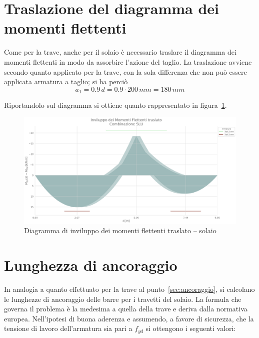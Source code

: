 \section{Traslazione del diagramma dei momenti flettenti }\label{sec:traslazioneSolaio}
Come per la trave, anche per il solaio è necessario traslare il diagramma dei momenti flettenti in modo da assorbire l'azione del taglio. La traslazione avviene secondo quanto applicato per la trave, con la sola differenza che non può essere applicata armatura a taglio; si ha perciò
\[
    a_1 = 0.9\,d = 0.9\cdot 200\,mm = 180\,mm
\]

Riportandolo sul diagramma si ottiene quanto rappresentato in figura~\ref{fig:MEd-MRd_traslato_solaio}.

\begin{figure}
    \centering
	\includegraphics[width=\textwidth]{MEd-MRd_traslato_solaio}
	\caption{Diagramma di inviluppo dei momenti flettenti traslato -- solaio}
	\label{fig:MEd-MRd_traslato_solaio}
\end{figure}

\section{Lunghezza di ancoraggio}\label{sec:ancoraggio_solaio}
In analogia a quanto effettuato per la trave al punto~\ref{sec:ancoraggio}, si calcolano le lunghezze di ancoraggio delle barre per i travetti del solaio. La formula che governa il problema è la medesima a quella della trave e deriva dalla normativa europea. Nell'ipotesi di buona aderenza e assumendo, a favore di sicurezza, che la tensione di lavoro dell'armatura sia pari a $f_{yd}$ si ottengono i seguenti valori:

